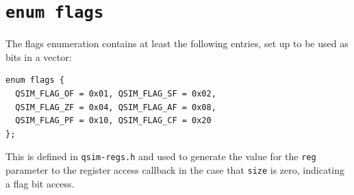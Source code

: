 \documentclass[letterpaper, 10pt]{book}
\begin{document}

\section{\texttt{enum flags}} \label{enum:flags}
The flags enumeration contains at least the following entries, set up to be
used as bits in a vector:

\begin{verbatim}
enum flags {
  QSIM_FLAG_OF = 0x01, QSIM_FLAG_SF = 0x02,
  QSIM_FLAG_ZF = 0x04, QSIM_FLAG_AF = 0x08,
  QSIM_FLAG_PF = 0x10, QSIM_FLAG_CF = 0x20
};
\end{verbatim}

This is defined in \texttt{qsim-regs.h} and used to generate the value for the
\texttt{reg} parameter to the register access callback in the case that
\texttt{size} is zero, indicating a flag bit access.
\end{document}
